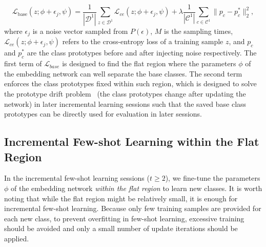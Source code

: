 \documentclass{article}
\begin{document}
\begin{equation}\label{eq:base_loss}
    \mathcal{L}_{\text{base}}(z;\phi +\epsilon_j, \psi) =  \frac{1}{|\mathcal{D}^1|}\sum_{z\in\mathcal{D}^1}\mathcal{L}_{ce}(z;\phi +\epsilon_j, \psi) + \lambda\frac{1}{|\mathcal{C}^1|}\sum_{c\in\mathcal{C}^1}\|p_c - p_c^*\|_2^2,
\end{equation}
where $\epsilon_j$ is a noise vector sampled from $P(\epsilon)$, $M$ is the sampling times, $\mathcal{L}_{ce}(z;\phi +\epsilon_j, \psi)$ refers to the cross-entropy loss of a training sample $z$, and $p_c$ and $p_c^*$ are the class prototypes before and after injecting noise respectively. The first term of $\mathcal{L}_{base}$ is designed to find the flat region where the parameters $\phi$ of the embedding network can well separate the base classes. The second term enforces the class prototypes fixed within such region, which is designed to solve the prototype drift problem~\citep{Yu2020SemanticDC, IDLVQC} (the class prototypes change after updating the network) in later incremental learning sessions such that the saved base class prototypes can be directly used for evaluation in later sessions.

\subsection{Incremental Few-shot Learning within the Flat Region} \label{sec:incremental}
In the incremental few-shot learning sessions ($t\geq 2$), we fine-tune the parameters $\phi$ of the embedding network \textit{within the flat region} to learn new classes. It is worth noting that while the flat region might be relatively small, it is enough for incremental few-shot learning. Because  only few training samples are provided for each new class, to prevent overfitting in few-shot learning, excessive training should be avoided and only a small number of update iterations should be applied. 
\end{document}
